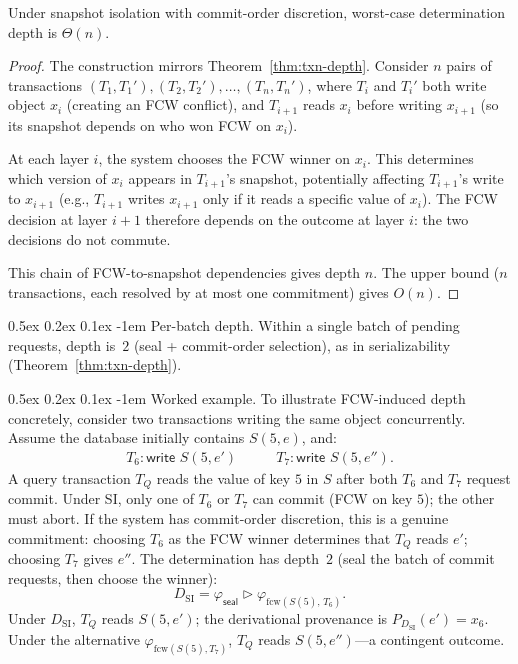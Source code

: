 \documentclass[acmsmall,review,anonymous]{acmart}
\makeatletter
\renewcommand{\paragraph}{\@startsection{paragraph}{4}{\z@}%
  {0.5ex \@plus 0.2ex \@minus 0.1ex}%
  {-1em}%
  {\normalfont\normalsize\bfseries}}
\newcommand{\seq}{\mathbin{\triangleright}}
\theoremstyle{remark}
\numberwithin{definition}{section}
\numberwithin{theorem}{section}
\numberwithin{lemma}{section}
\numberwithin{corollary}{section}
\numberwithin{remark}{section}
\numberwithin{example}{section}
\numberwithin{observation}{section}
\numberwithin{assumption}{section}
\makeatother
\begin{document}
\begin{proposition}
  \label{prop:si-depth-n}
  Under snapshot isolation with commit-order discretion, worst-case
  determination depth is $\Theta(n)$.
\end{proposition}
\begin{proof}
  The construction mirrors Theorem~\ref{thm:txn-depth}.
  Consider $n$ pairs of transactions $(T_1, T_1'), (T_2, T_2'), \ldots,
  (T_n, T_n')$, where $T_i$ and $T_i'$ both write object $x_i$
  (creating an FCW conflict), and $T_{i+1}$ reads $x_i$ before writing
  $x_{i+1}$ (so its snapshot depends on who won FCW on $x_i$).

  At each layer $i$, the system chooses the FCW winner on $x_i$.
  This determines which version of $x_i$ appears in $T_{i+1}$'s
  snapshot, potentially affecting $T_{i+1}$'s write to $x_{i+1}$
  (e.g., $T_{i+1}$ writes $x_{i+1}$ only if it reads a specific value
  of $x_i$).
  The FCW decision at layer $i+1$ therefore depends on the outcome at
  layer $i$: the two decisions do not commute.

  This chain of FCW-to-snapshot dependencies gives depth $n$.
  The upper bound ($n$ transactions, each resolved by at most one
  commitment) gives $O(n)$.
\end{proof}

\paragraph{Per-batch depth.}
Within a single batch of pending requests, depth is~$2$
(seal + commit-order selection), as in serializability
(Theorem~\ref{thm:txn-depth}).

\paragraph{Worked example.}
To illustrate FCW-induced depth concretely, consider two transactions
writing the same object concurrently.
Assume the database initially contains $S(5,e)$, and:
\[
  \begin{array}{ll}
    T_6: \textsf{write } S(5,e') \qquad &
    T_7: \textsf{write } S(5,e'').
  \end{array}
\]
A query transaction $T_Q$ reads the value of key $5$ in $S$ after both
$T_6$ and $T_7$ request commit.
Under SI, only one of $T_6$ or $T_7$ can commit (FCW on key $5$);
the other must abort.
If the system has commit-order discretion, this is a genuine
commitment: choosing $T_6$ as the FCW winner determines that $T_Q$
reads $e'$; choosing $T_7$ gives $e''$.
The determination has depth~$2$ (seal the batch of commit requests,
then choose the winner):
\[
  D_{\mathrm{SI}} =
    \varphi_{\mathsf{seal}} \seq \varphi_{\mathrm{fcw}(S(5),\,T_6)}.
\]
Under $D_{\mathrm{SI}}$, $T_Q$ reads $S(5,e')$; the derivational
provenance is $P_{D_{\mathrm{SI}}}(e') = x_6$.
Under the alternative $\varphi_{\mathrm{fcw}(S(5),T_7)}$, $T_Q$ reads
$S(5,e'')$---a contingent outcome.
\end{document}
